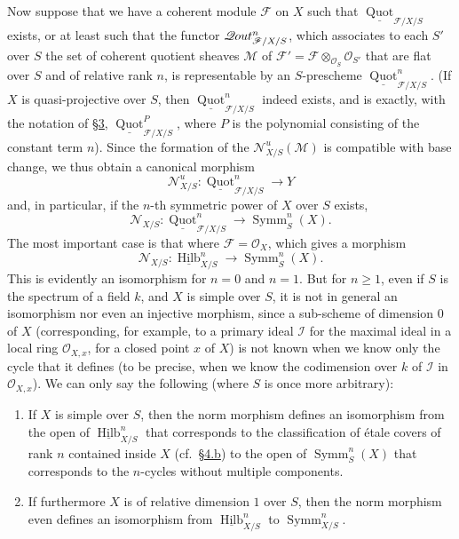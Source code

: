 \documentclass{article}
\providecommand{\tightlist}{%
  \setlength{\itemsep}{0pt}\setlength{\parskip}{0pt}}
\theoremstyle{definition}
\theoremstyle{definition}
\theoremstyle{definition}
\theoremstyle{definition}
\theoremstyle{remark}
\begin{document}
Now suppose that we have a coherent module \({\mathscr{F}}\) on \(X\) such that \(\underline{\operatorname{Quot}}_{{{\mathscr{F}}/X/S}}\) exists, or at least such that the functor \(\mathscr{Q}\kern -.5pt out_{{{\mathscr{F}}/X/S}}^n\), which associates to each \(S'\) over \(S\) the set of coherent quotient sheaves \({\mathscr{M}}\) of \({\mathscr{F}}'={\mathscr{F}}\otimes_{{\mathscr{O}}_S}{\mathscr{O}}_{S'}\) that are flat over \(S\) and of relative rank \(n\), is representable by an \(S\)-prescheme \(\underline{\operatorname{Quot}}_{{{\mathscr{F}}/X/S}}^n\).
(If \(X\) is quasi-projective over \(S\), then \(\underline{\operatorname{Quot}}_{{{\mathscr{F}}/X/S}}^n\) indeed exists, and is exactly, with the notation of \protect\hyperlink{fga-3-iv-section-3}{§3}, \(\underline{\operatorname{Quot}}_{{{\mathscr{F}}/X/S}}^P\), where \(P\) is the polynomial consisting of the constant term \(n\)).
Since the formation of the \({\mathscr{N}}_{X/S}^u({\mathscr{M}})\) is compatible with base change, we thus obtain a canonical morphism
\[
  {\mathscr{N}}_{X/S}^u\colon \underline{\operatorname{Quot}}_{{{\mathscr{F}}/X/S}}^n \to Y
\]
and, in particular, if the \(n\)-th symmetric power of \(X\) over \(S\) exists,
\[
  {\mathscr{N}}_{X/S}\colon \underline{\operatorname{Quot}}_{{{\mathscr{F}}/X/S}}^n \to \operatorname{Symm}_S^n(X).
\]
The most important case is that where \({\mathscr{F}}={\mathscr{O}}_X\), which gives a morphism
\[
  {\mathscr{N}}_{X/S}\colon \underline{\operatorname{Hilb}}_{X/S}^n \to \operatorname{Symm}_S^n(X).
\]
This is evidently an isomorphism for \(n=0\) and \(n=1\).
But for \(n\geqslant 1\), even if \(S\) is the spectrum of a field \(k\), and \(X\) is simple over \(S\), it is not in general an isomorphism nor even an injective morphism, since a sub-scheme of dimension \(0\) of \(X\) (corresponding, for example, to a primary ideal \({\mathscr{I}}\) for the maximal ideal in a local ring \({\mathscr{O}}_{X,x}\), for a closed point \(x\) of \(X\)) is not known when we know only the cycle that it defines (to be precise, when we know the codimension over \(k\) of \({\mathscr{I}}\) in \({\mathscr{O}}_{X,x}\)).
We can only say the following (where \(S\) is once more arbitrary):

\begin{enumerate}
\def\labelenumi{\alph{enumi}.}
\tightlist
\item
  If \(X\) is simple over \(S\), then the norm morphism defines an isomorphism from the open of \(\underline{\operatorname{Hilb}}_{X/S}^n\) that corresponds to the classification of étale covers of rank \(n\) contained inside \(X\) (cf.~\protect\hyperlink{fga-3-iv-section-4}{§4.b}) to the open of \(\operatorname{Symm}_S^n(X)\) that corresponds to the \(n\)-cycles without multiple components.
\item
  If furthermore \(X\) is of relative dimension \(1\) over \(S\), then the norm morphism even defines an isomorphism from \(\underline{\operatorname{Hilb}}_{X/S}^n\) to \(\operatorname{Symm}_{X/S}^n\).
\end{enumerate}
\end{document}
